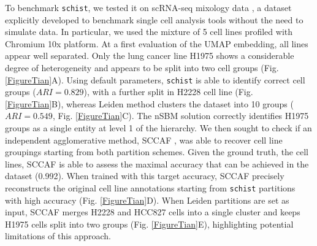 \documentclass[10pt]{article}
\begin{document}
To benchmark \texttt{schist}, we tested it on scRNA-seq mixology data \cite{Tian_2019}, a dataset explicitly developed to benchmark single cell analysis tools without the need to simulate data. In particular, we used the mixture of 5 cell lines profiled with Chromium 10x platform. At a first evaluation of the UMAP embedding, all lines appear well separated. Only the lung cancer line H1975 shows a considerable degree of heterogeneity and appears to be split into two cell groups (Fig. \ref{FigureTian}A). Using default parameters, \texttt{schist} is able to identify correct cell groups ($ARI=0.829$), with a further split in H2228 cell line (Fig. \ref{FigureTian}B), whereas Leiden method clusters the dataset into 10 groups ($ARI=0.549$, Fig. \ref{FigureTian}C). The nSBM solution correctly identifies H1975 groups as a single entity at level 1 of the hierarchy. We then sought to check if an independent agglomerative method, SCCAF \cite{miao_2020}, was able to recover cell line groupings starting from both partition schemes. Given the ground truth, the cell lines, SCCAF is able to assess the maximal accuracy that can be achieved in the dataset (0.992). When trained with this target accuracy, SCCAF precisely reconstructs the original cell line annotations starting from \texttt{schist} partitions with high accuracy (Fig. \ref{FigureTian}D). When Leiden partitions are set as input, SCCAF merges H2228 and HCC827 cells into a single cluster and keeps H1975 cells split into two groups (Fig. \ref{FigureTian}E), highlighting potential limitations of this approach. %
\end{document}
